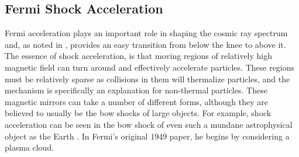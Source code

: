 \subsection{Fermi Shock Acceleration}
\label{fermi}
Fermi acceleration plays an important role in shaping the cosmic ray spectrum and, as noted in \cite{crapp}, provides an easy transition from below the knee to above it. The essence of shock acceleration, is that moving regions of relatively high magnetic field can turn around and effectively accelerate particles. These regions must be relatively sparse as collisions in them will thermalize particles, and the mechanism is specifically an explanation for non-thermal particles. These magnetic mirrors can take a number of different forms, although they are believed to usually be the bow shocks of large objects. For example, shock acceleration can be seen in the bow shock of even such a mundane astrophysical object as the Earth \cite{shocks}. In Fermi's original 1949 paper, he begins by considering a plasma cloud.

